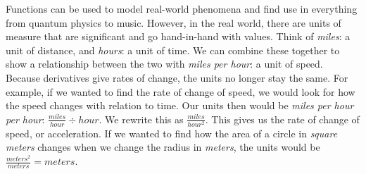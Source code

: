 \documentclass[../revisedmain.tex]{subfiles}
\begin{document}
	Functions can be used to model real-world phenomena and find use in everything from quantum physics to music. However, in the real world, there are units of measure that are significant and go hand-in-hand with values. Think of \textit{miles}: a unit of distance, and \textit{hours}: a unit of time. We can combine these together to show a relationship between the two with \textit{miles per hour}: a  unit of speed. Because derivatives give rates of change, the units no longer stay the same. For example, if we wanted to find the rate of change of speed, we would look for how the speed changes with relation to time. Our units then would be \textit{miles per hour per hour}: $\displaystyle\frac{miles}{hour}\div hour$. We rewrite this as $\displaystyle\frac{miles}{hour^2}$. This gives us the rate of change of speed, or acceleration. If we wanted to find how the area of a circle in \textit{square meters} changes when we change the radius in \textit{meters}, the units would be $\displaystyle\frac{meters^2}{meters} = meters$.\\
\end{document}
